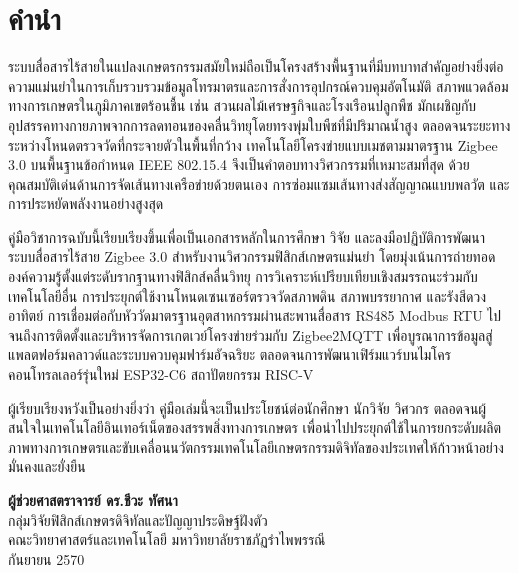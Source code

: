 \chapter*{คำนำ}

ระบบสื่อสารไร้สายในแปลงเกษตรกรรมสมัยใหม่ถือเป็นโครงสร้างพื้นฐานที่มีบทบาทสำคัญอย่างยิ่งต่อความแม่นยำในการเก็บรวบรวมข้อมูลโทรมาตรและการสั่งการอุปกรณ์ควบคุมอัตโนมัติ สภาพแวดล้อมทางการเกษตรในภูมิภาคเขตร้อนชื้น เช่น สวนผลไม้เศรษฐกิจและโรงเรือนปลูกพืช มักเผชิญกับอุปสรรคทางกายภาพจากการลดทอนของคลื่นวิทยุโดยทรงพุ่มใบพืชที่มีปริมาณน้ำสูง ตลอดจนระยะทางระหว่างโหนดตรวจวัดที่กระจายตัวในพื้นที่กว้าง เทคโนโลยีโครงข่ายแบบเมชตามมาตรฐาน Zigbee 3.0 บนพื้นฐานข้อกำหนด IEEE 802.15.4 จึงเป็นคำตอบทางวิศวกรรมที่เหมาะสมที่สุด ด้วยคุณสมบัติเด่นด้านการจัดเส้นทางเครือข่ายด้วยตนเอง การซ่อมแซมเส้นทางส่งสัญญาณแบบพลวัต และการประหยัดพลังงานอย่างสูงสุด

คู่มือวิชาการฉบับนี้เรียบเรียงขึ้นเพื่อเป็นเอกสารหลักในการศึกษา วิจัย และลงมือปฏิบัติการพัฒนาระบบสื่อสารไร้สาย Zigbee 3.0 สำหรับงานวิศวกรรมฟิสิกส์เกษตรแม่นยำ โดยมุ่งเน้นการถ่ายทอดองค์ความรู้ตั้งแต่ระดับรากฐานทางฟิสิกส์คลื่นวิทยุ การวิเคราะห์เปรียบเทียบเชิงสมรรถนะร่วมกับเทคโนโลยีอื่น การประยุกต์ใช้งานโหนดเซนเซอร์ตรวจวัดสภาพดิน สภาพบรรยากาศ และรังสีดวงอาทิตย์ การเชื่อมต่อกับหัววัดมาตรฐานอุตสาหกรรมผ่านสะพานสื่อสาร RS485 Modbus RTU ไปจนถึงการติดตั้งและบริหารจัดการเกตเวย์โครงข่ายร่วมกับ Zigbee2MQTT เพื่อบูรณาการข้อมูลสู่แพลตฟอร์มคลาวด์และระบบควบคุมฟาร์มอัจฉริยะ ตลอดจนการพัฒนาเฟิร์มแวร์บนไมโครคอนโทรลเลอร์รุ่นใหม่ ESP32-C6 สถาปัตยกรรม RISC-V

ผู้เรียบเรียงหวังเป็นอย่างยิ่งว่า คู่มือเล่มนี้จะเป็นประโยชน์ต่อนักศึกษา นักวิจัย วิศวกร ตลอดจนผู้สนใจในเทคโนโลยีอินเทอร์เน็ตของสรรพสิ่งทางการเกษตร เพื่อนำไปประยุกต์ใช้ในการยกระดับผลิตภาพทางการเกษตรและขับเคลื่อนนวัตกรรมเทคโนโลยีเกษตรกรรมดิจิทัลของประเทศให้ก้าวหน้าอย่างมั่นคงและยั่งยืน

\vspace{1.5cm}
\begin{flushright}
    \textbf{ผู้ช่วยศาสตราจารย์ ดร.ชีวะ ทัศนา}\\
    กลุ่มวิจัยฟิสิกส์เกษตรดิจิทัลและปัญญาประดิษฐ์ฝังตัว\\
    คณะวิทยาศาสตร์และเทคโนโลยี มหาวิทยาลัยราชภัฏรำไพพรรณี\\
    กันยายน 2570
\end{flushright}
\clearpage
